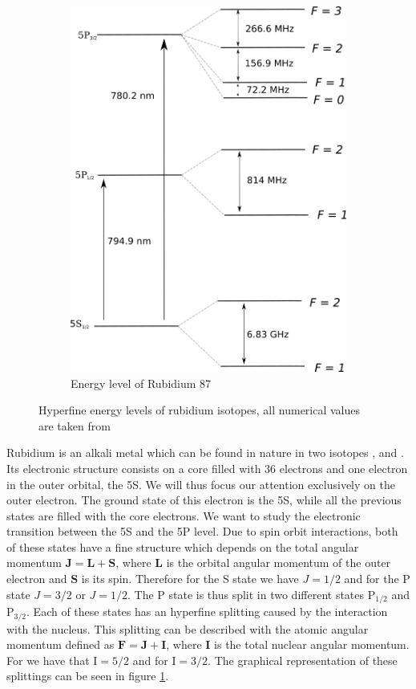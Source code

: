 \documentclass[a4paper,10pt]{article}
\begin{document}
\begin{figure}[H]
\begin{subfigure}[b]{0.49\textwidth}
        \includegraphics[width=\textwidth]{rubidium87}
        \caption{Energy level of Rubidium 87}
    \end{subfigure}
\caption{Hyperfine energy levels of rubidium isotopes, all numerical values are taken from \cite{rubidium87data}}\label{rubidium}
\end{figure}
Rubidium is an alkali metal which can be found in nature in two isotopes , and . Its electronic structure consists on a core filled with 36 electrons and one electron in the outer orbital, the 5S. We will thus focus our attention exclusively on the outer electron. The ground state of this electron is the 5S, while all the previous states are filled with the core electrons. We want to study the electronic transition between the 5S and the 5P level. Due to spin orbit interactions, both of these states have a fine structure which depends on the total angular momentum $\mathbf{J} = \mathbf{L}+\mathbf{S}$, where $\mathbf{L}$ is the orbital angular momentum of the outer electron and $\mathbf{S}$ is its spin. Therefore for the S state we have $J=1/2$ and for the P state $J=3/2$ or $J=1/2$. The P state is thus split in two different states $\text{P}_{1/2}$ and $\text{P}_{3/2}$. Each of these states has an hyperfine splitting caused by the interaction with the nucleus. This splitting can be described with the atomic angular momentum defined as $\mathbf{F} = \mathbf{J} + \mathbf{I}$, where $\mathbf{I}$ is the total nuclear angular momentum. For  we have that $\text{I} = 5/2$ and for  $\text{I}=3/2$. The graphical representation of these splittings can be seen in figure \ref{rubidium}.\\
\end{document}
